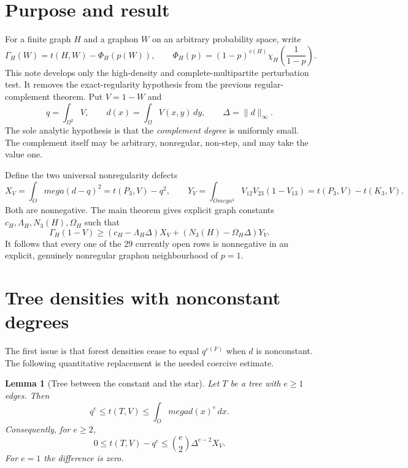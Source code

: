 \documentclass[11pt]{article}
\newtheorem{lemma}[theorem]{Lemma}
\newcommand{\dd}{\,d}
\begin{document}
\section{Purpose and result}

For a finite graph $H$ and a graphon $W$ on an arbitrary probability space,
write
\[
 \Gamma_H(W)=t(H,W)-\Phi_H(p(W)),
 \qquad
 \Phi_H(p)=(1-p)^{v(H)}
 \chi_H\!\left(\frac1{1-p}\right).
\]
This note develops only the high-density and complete-multipartite
perturbation test.  It removes the exact-regularity hypothesis from the
previous regular-complement theorem.  Put $V=1-W$ and
\[
 q=\int_{\Omega^2}V,
 \qquad d(x)=\int_\Omega V(x,y)\dd y,
 \qquad \Delta=\lVert d\rVert_\infty.
\]
The sole analytic hypothesis is that the \emph{complement degree} is
uniformly small.  The complement itself may be arbitrary, nonregular,
non-step, and may take the value one.

Define the two universal nonregularity defects
\begin{equation}
 X_V=\int_Omega(d-q)^2
     =t(P_3,V)-q^2,
 \qquad
 Y_V=\int_{Omega^3}V_{12}V_{23}(1-V_{13})
     =t(P_3,V)-t(K_3,V).
 \label{eq:defects}
\end{equation}
Both are nonnegative.  The main theorem gives explicit graph constants
$c_H,\Lambda_H,N_3(H),\Omega_H$ such that
\begin{equation}
 \Gamma_H(1-V)\geq
 (c_H-\Lambda_H\Delta)X_V
 +(N_3(H)-\Omega_H\Delta)Y_V.
 \label{eq:main-preview}
\end{equation}
It follows that every one of the $29$ currently open rows is nonnegative in
an explicit, genuinely nonregular graphon neighbourhood of $p=1$.


\section{Tree densities with nonconstant degrees}

The first issue is that forest densities cease to equal $q^{e(F)}$ when
$d$ is nonconstant.  The following quantitative replacement is the needed
coercive estimate.

\begin{lemma}[Tree between the constant and the star]
\label{lem:tree-star}
Let $T$ be a tree with $e\geq1$ edges.  Then
\begin{equation}
 q^e\leq t(T,V)\leq\int_Omega d(x)^e\dd x.
 \label{eq:tree-star}
\end{equation}
Consequently, for $e\geq2$,
\begin{equation}
 0\leq t(T,V)-q^e
 \leq \binom e2\Delta^{e-2}X_V.
 \label{eq:tree-variance}
\end{equation}
For $e=1$ the difference is zero.
\end{lemma}
\end{document}
